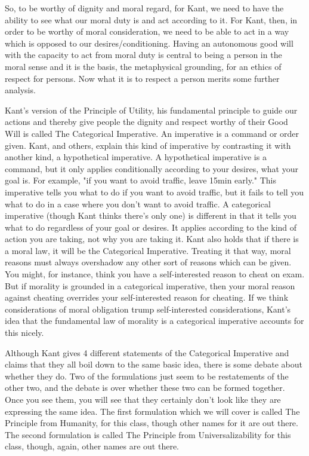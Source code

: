 So, to be worthy of dignity and moral regard, for Kant, we need to have the ability to see what our moral duty is and act according to it. For Kant, then, in order to be worthy of moral consideration, we need to be able to act in a way which is opposed to our desires/conditioning. Having an autonomous good will with the capacity to act from moral duty is central to being a person in the moral sense and it is the basis, the metaphysical grounding, for an ethics of respect for persons. Now what it is to respect a person merits some further analysis.

Kant's version of the Principle of Utility, his fundamental principle to guide our actions and thereby give people the dignity and respect worthy of their Good Will is called The Categorical Imperative. An imperative is a command or order given. Kant, and others, explain this kind of imperative by contrasting it with another kind, a hypothetical imperative. A hypothetical imperative is a command, but it only applies conditionally according to your desires, what your goal is. For example, "if you want to avoid traffic, leave 15min early." This imperative tells you what to do if you want to avoid traffic, but it fails to tell you what to do in a case where you don't want to avoid traffic. A categorical imperative (though Kant thinks there's only one) is different in that it tells you what to do regardless of your goal or desires. It applies according to the kind of action you are taking, not why you are taking it. Kant also holds that if there is a moral law, it will be the Categorical Imperative. Treating it that way, moral reasons must always overshadow any other sort of reasons which can be given. You might, for instance, think you have a self-interested reason to cheat on exam. But if morality is grounded in a categorical imperative, then your moral reason against cheating overrides your self-interested reason for cheating. If we think considerations of moral obligation trump self-interested considerations, Kant’s idea that the fundamental law of morality is a categorical imperative accounts for this nicely.

Although Kant gives 4 different statements of the Categorical Imperative and claims that they all boil down to the same basic idea, there is some debate about whether they do. Two of the formulations just seem to be restatements of the other two, and the debate is over whether these two can be formed together. Once you see them, you will see that they certainly don't look like they are expressing the same idea. The first formulation which we will cover is called The Principle from Humanity, for this class, though other names for it are out there. The second formulation is called The Principle from Universalizability for this class, though, again, other names are out there.
